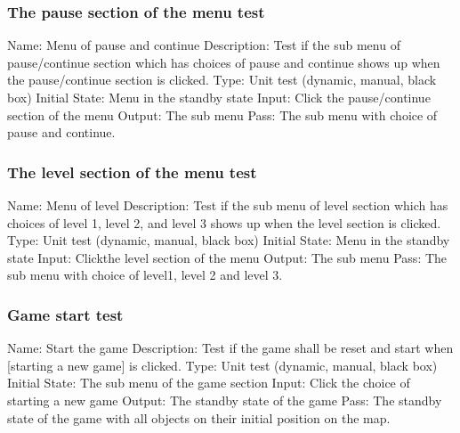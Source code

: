 \documentclass{article}
\begin{document}
\subsubsection{The pause section of the menu test}
Name: Menu of pause and continue\newline
Description: Test if the sub menu of pause/continue section which has choices of pause and continue shows up when the pause/continue section is clicked. \newline
Type: Unit test (dynamic, manual, black box) \newline
Initial State:  Menu in the standby state \newline
Input: Click the pause/continue section of the menu \newline
Output: The sub menu  \newline
Pass: The sub menu with choice of pause and continue. \newline

\subsubsection{The level section of the menu test}
Name:  Menu of level\newline
Description: Test if the sub menu of level section which has choices of level 1, level 2, and level 3 shows up when the level section is clicked. \newline
Type: Unit test (dynamic, manual, black box) \newline
Initial State: Menu in the standby state \newline
Input: Clickthe level section of the menu\newline
Output: The sub menu\newline
Pass: The sub menu with choice of level1, level 2 and level 3. \newline

\subsubsection{Game start test}
Name:  Start the game\newline
Description: Test if the game shall be reset and start when [starting a new game] is clicked. \newline
Type: Unit test (dynamic, manual, black box) \newline
Initial State:  The sub menu of the game section \newline
Input: Click the choice of starting a new game \newline
Output: The standby state of the game\newline
Pass: The standby state of the game with all objects on their initial position on the map. \newline
\end{document}
